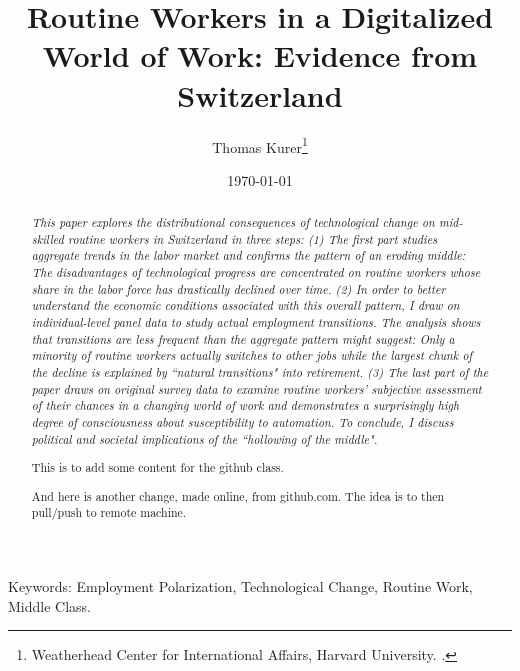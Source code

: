 \documentclass[smallheadings,12pt,a4paper, bibtotoc, abstracton, pointlessnumbers]{scrartcl}
\begin{document}
	
	
	\title{\Large{Routine Workers in a Digitalized World of Work: Evidence from Switzerland}}
	
	\author{\large
		Thomas Kurer\thanks{Weatherhead Center for International Affairs, Harvard University. .}
	}
	
	\date{\small{\today} \\ %
	}
	\maketitle
	\begin{abstract}
		\noindent
		{\em
This paper explores the distributional consequences of technological change on mid-skilled routine workers in Switzerland in three steps: (1) The first part studies aggregate trends in the labor market and confirms the pattern of an eroding middle: The disadvantages of technological progress are concentrated on routine workers whose share in the labor force has drastically declined over time. (2) In order to better understand the economic conditions associated with this overall pattern, I draw on individual-level panel data to study actual employment transitions. The analysis shows that transitions are less frequent than the aggregate pattern might suggest: Only a minority of routine workers actually switches to other jobs while the largest chunk of the decline is explained by ``natural transitions" into retirement. (3) The last part of the paper draws on original survey data to examine routine workers' subjective assessment of their chances in a changing world of work and demonstrates a surprisingly high degree of consciousness about susceptibility to automation. To conclude, I discuss political and societal implications of the ``hollowing of the middle".

This is to add some content for the github class.

And here is another change, made online, from github.com. The idea is to then pull/push to remote machine.
		}

	\end{abstract}
\vspace{1cm}
Keywords: Employment Polarization, Technological Change, Routine Work, Middle Class.
	
	\thispagestyle{empty}
\end{document}
